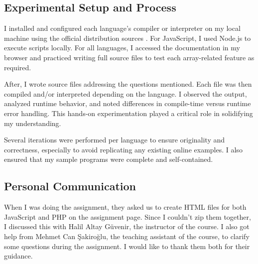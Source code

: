 \documentclass{article}
\begin{document}
\subsection{Experimental Setup and Process}

I installed and configured each language's compiler or interpreter on my local machine using the official distribution sources \cite{dartcomp, gocomp, jscomp, kotlinc, phpcomp, pycomp, rustcomp}. For JavaScript, I used Node.js to execute scripts locally. For all languages, I accessed the documentation in my browser and practiced writing full source files to test each array-related feature as required.

After, I wrote source files addressing the questions mentioned. Each file was then compiled and/or interpreted depending on the language. I observed the output, analyzed runtime behavior, and noted differences in compile-time versus runtime error handling. This hands-on experimentation played a critical role in solidifying my understanding.

Several iterations were performed per language to ensure originality and correctness, especially to avoid replicating any existing online examples. I also ensured that my sample programs were complete and self-contained.

\subsection{Personal Communication}
When I was doing the assignment, they asked us to create HTML files for both JavaScript and PHP on the assignment page. Since I couldn't zip them together, I discussed this with Halil Altay Güvenir, the instructor of the course. I also got help from Mehmet Can Şakiroğlu, the teaching assistant of the course, to clarify some questions during the assignment. I would like to thank them both for their guidance.



\newpage


\end{document}
